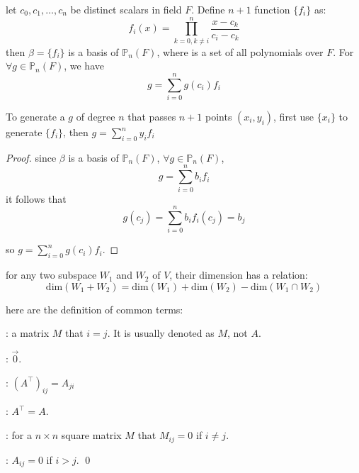 \begin{definition}
let ${c_0, c_1, \dots, c_n}$ be distinct scalars in field $F$. Define  $n+1$ function $\{f_i \}$ as:
	\begin{equation}
	f_i(x) = \prod_{k=0, k \neq i}^n \frac{x - c_k}{c_i - c_k}
\end{equation}
then $\beta = \{f_i\}$ is a basis of $\mathbb{P}_n(F)$, where  is a set of all polynomials over $F$. For $\forall g \in \mathbb{P}_n(F)$, we have
	\begin{equation}
		g = \sum_{i=0}^n g(c_i) f_i
	\end{equation}
	
	To generate a $g$ of degree $n$ that passes $n+1$ points $(x_i, y_i)$, first use $\{x_i\}$ to generate $\{f_i \}$, then $g = \sum\limits_{i=0}^n y_i f_i $
\end{definition}


\begin{proof}
	since $\beta$ is a basis of $\mathbb{P}_n(F)$, $\forall g \in \mathbb{P}_n(F)$,
	\begin{equation*}
		g = \sum_{i=0}^n b_i f_i
	\end{equation*}
	it follows that
	\begin{equation*}
		g(c_j) = \sum_{i=0}^n b_i f_i(c_j) = b_j
	\end{equation*}

	so $g = \sum\limits_{i=0}^n g(c_i) f_i$.
\end{proof}


\begin{theorem}
for any two subspace $W_1$ and $W_2$ of $V$, their dimension has a relation:
\begin{equation}
	\text{dim}(W_1 + W_2) = \text{dim}(W_1) + \text{dim}(W_2) - \text{dim}(W_1 \cap W_2)
\end{equation}
\end{theorem}


\begin{definition}
    here are the definition of common terms:
    
    : a matrix $M$ that $i = j$. It is usually denoted as $M$, not $A$.
        
    : $\vec{0}$.
    
    : $(A^\top)_{ij} = A_{ji}$
    
    : $A^\top = A$.

    : for a $n \times n$ square matrix $M$ that $M_{ij} = 0$ if $i \neq j$.
    
    : $A_{ij} = 0$ if $i > j$.
    \qed    
\end{definition}

